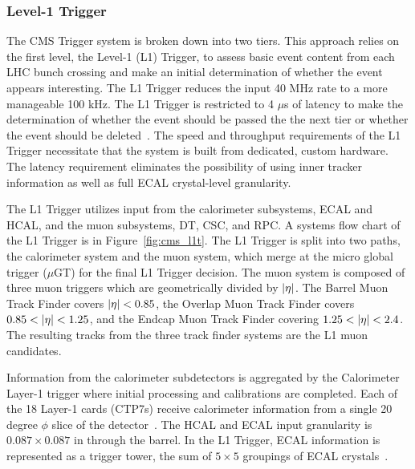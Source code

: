 \subsubsection{Level-1 Trigger}
The CMS Trigger system is broken down into two tiers. This approach relies on
the first level, the Level-1 (L1) Trigger, to assess basic event content from each LHC
bunch crossing and make an initial determination of whether the event appears interesting.
The L1 Trigger reduces the input 40 MHz rate to a more manageable
100 kHz. The L1 Trigger is restricted to 4 $\mu$s of latency
to make the determination of whether the event should be passed the the next tier or whether
the event should be deleted~\cite{Khachatryan:2016bia}. 
The speed and throughput requirements of the L1 Trigger necessitate that the system 
is built from dedicated, custom hardware. The latency requirement eliminates
the possibility of using inner tracker information as well as full ECAL crystal-level
granularity.

The L1 Trigger utilizes input from the calorimeter subsystems, ECAL and HCAL, and the muon 
subsystems, DT, CSC, and RPC. A systems flow chart of the L1 Trigger is in
Figure~\ref{fig:cms_l1t}. The L1 Trigger is split into two paths, the calorimeter system
and the muon system, which merge at the micro global trigger ($\mu$GT) for the
final L1 Trigger decision. The muon system is composed of three muon triggers which are
geometrically divided by $\lvert\eta\rvert$. The Barrel Muon Track Finder covers $\lvert\eta\rvert < 0.85$,
the Overlap Muon Track Finder covers $0.85 < \lvert\eta\rvert < 1.25$, and the Endcap Muon
Track Finder covering $1.25 < \lvert\eta\rvert < 2.4$. The resulting tracks from the three
track finder systems are the L1 muon candidates.

Information from the calorimeter subdetectors is aggregated by the
Calorimeter Layer-1 trigger where initial processing and calibrations are completed.
Each of the 18 Layer-1 cards (CTP7s) receive calorimeter information from a single 20 degree $\phi$ slice 
of the detector~\cite{Cadamuro:2017slr}. The HCAL and ECAL input granularity is $0.087 \times 0.087$ in \etaphi
through the barrel. 
In the L1 Trigger, 
ECAL information is represented as a trigger tower, the sum of $5 \times 5$ groupings of 
ECAL crystals~\cite{Khachatryan:2016bia}.

